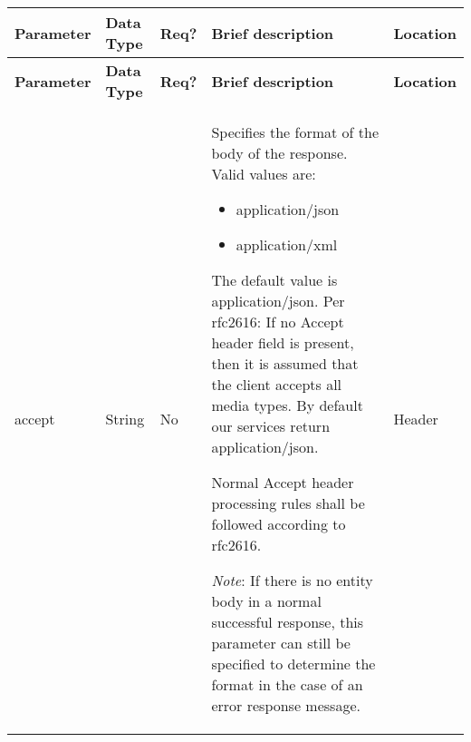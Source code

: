 \begin{longtable}{|>{\raggedright}p{}|>{\raggedright}p{}|>{\raggedright}p{}|>{\raggedright}p{}|>{\raggedright}p{}|}
\hline
\hline 
\textbf{\footnotesize{Parameter }} & \textbf{\footnotesize{Data Type}} & \textbf{\footnotesize{Req?}} & \textbf{\footnotesize{Brief description}} & \textbf{\footnotesize{Location}}\tabularnewline
\hline 
\hline
\endfirsthead
\hline
\hline 
\textbf{\footnotesize{Parameter }} & \textbf{\footnotesize{Data Type}} & \textbf{\footnotesize{Req?}} & \textbf{\footnotesize{Brief description}} & \textbf{\footnotesize{Location}}\tabularnewline
\hline 
\hline
\endhead
\hline 
{\footnotesize{accept}} & {\footnotesize{String}} & {\footnotesize{No}} & {\footnotesize{Specifies the format of the body of the response. Valid
values are: }}{\footnotesize \par}
\begin{itemize}
\item {\footnotesize{application/json}}{\footnotesize \par}
\item {\footnotesize{application/xml}}{\footnotesize \par}
\end{itemize}
{\footnotesize{The default value is application/json. Per rfc2616:
\textquotedbl{}If no Accept header field is present, then it is assumed
that the client accepts all media types.\textquotedbl{} By default
our services return application/json.}}{\footnotesize \par}

{\footnotesize{Normal Accept header processing rules shall be followed
according to rfc2616.}}{\footnotesize \par}

\emph{\footnotesize{Note}}{\footnotesize{: If there is no entity body
in a normal successful response, this parameter can still be specified
to determine the format in the case of an error response message.}} & {\footnotesize{Header}}\tabularnewline
\hline 
\end{longtable}
